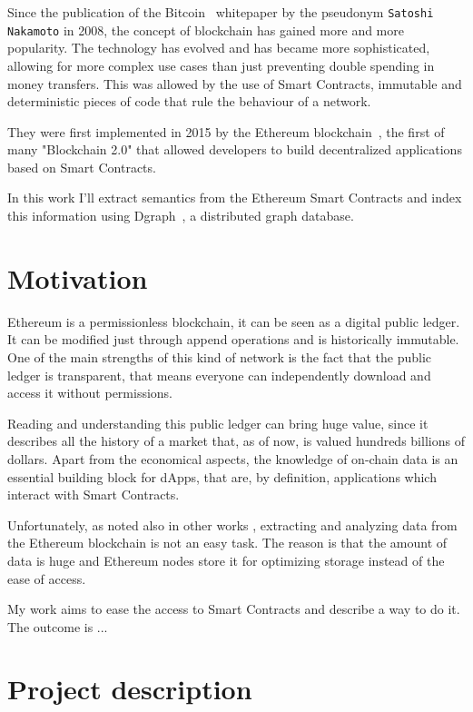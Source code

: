 
Since the publication of the Bitcoin~\cite{bitcoin} whitepaper by the pseudonym {\tt Satoshi Nakamoto} in 2008, the concept of blockchain has gained more and more popularity. The technology has evolved and has became more sophisticated, allowing for more complex use cases than just preventing double spending in money transfers. This was allowed by the use of Smart Contracts, immutable and deterministic pieces of code that rule the behaviour of a network.

\noindent They were first implemented in 2015 by the Ethereum blockchain~\cite{Ethereum}, the first of many "Blockchain 2.0" that allowed developers to build decentralized applications based on Smart Contracts. 

\noindent In this work I'll extract semantics from the Ethereum Smart Contracts and index this information using Dgraph~\cite{dgraph}, a distributed graph database.

\section{Motivation}

Ethereum is a permissionless blockchain, it can be seen as a digital public ledger. It can be modified just through append operations and is historically immutable. One of the main strengths of this kind of network is the fact that the public ledger is transparent, that means everyone can independently download and access it without permissions.

\noindent Reading and understanding this public ledger can bring huge value, since it describes all the history of a market that, as of now, is valued hundreds billions of dollars. Apart from the economical aspects, the knowledge of on-chain data is an essential building block for dApps, that are, by definition, applications which interact with Smart Contracts.

\noindent Unfortunately, as noted also in other works \cite{dataether,xblock-eth,ethereum_query_language}, extracting and analyzing data from the Ethereum blockchain is not an easy task. The reason is that the amount of data is huge and Ethereum nodes store it for optimizing storage instead of the ease of access.

\noindent My work aims to ease the access to Smart Contracts and describe a way to do it. The outcome is ...


\section{Project description}

